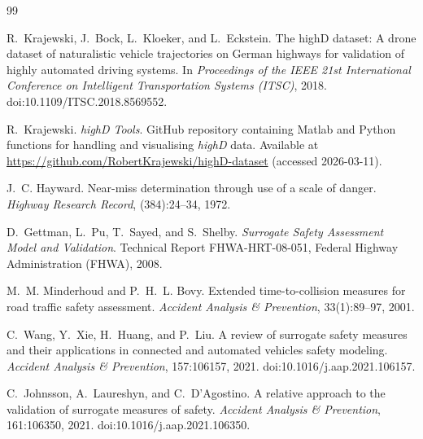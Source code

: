 \documentclass[12pt,a4paper,twoside,openright]{report}
\begin{document}
    \cleardoublepage
    \begin{thebibliography}{99}

        R.~Krajewski, J.~Bock, L.~Kloeker, and L.~Eckstein.
        \newblock The highD dataset: A drone dataset of naturalistic vehicle trajectories on German highways for validation of highly automated driving systems.
        \newblock In \emph{Proceedings of the IEEE 21st International Conference on Intelligent Transportation Systems (ITSC)}, 2018.
        \newblock doi:10.1109/ITSC.2018.8569552.

        R.~Krajewski.
        \newblock \emph{highD Tools}.
        \newblock GitHub repository containing Matlab and Python functions for handling and visualising \textit{highD} data.
        \newblock Available at \url{https://github.com/RobertKrajewski/highD-dataset} (accessed 2026-03-11).

        J.~C. Hayward.
        \newblock Near-miss determination through use of a scale of danger.
        \newblock \emph{Highway Research Record}, (384):24--34, 1972.

        D.~Gettman, L.~Pu, T.~Sayed, and S.~Shelby.
        \newblock \emph{Surrogate Safety Assessment Model and Validation}.
        \newblock Technical Report FHWA-HRT-08-051, Federal Highway Administration (FHWA), 2008.

        M.~M. Minderhoud and P.~H.~L. Bovy.
        \newblock Extended time-to-collision measures for road traffic safety assessment.
        \newblock \emph{Accident Analysis \& Prevention}, 33(1):89--97, 2001.

        C.~Wang, Y.~Xie, H.~Huang, and P.~Liu.
        \newblock A review of surrogate safety measures and their applications in connected and automated vehicles safety modeling.
        \newblock \emph{Accident Analysis \& Prevention}, 157:106157, 2021.
        \newblock doi:10.1016/j.aap.2021.106157.

        C.~Johnsson, A.~Laureshyn, and C.~D'Agostino.
        \newblock A relative approach to the validation of surrogate measures of safety.
        \newblock \emph{Accident Analysis \& Prevention}, 161:106350, 2021.
        \newblock doi:10.1016/j.aap.2021.106350.


\end{thebibliography}
\end{document}
